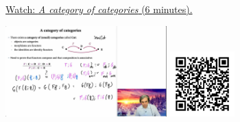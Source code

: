 
\begin{minipage}{10cm}
    \href{https://act4e-spring21.netlify.app/videos/spring2021-functors:semi-and-fun:cat-of-cat.html}{Watch: \emph{A category of categories} (6 minutes).}
        
    \href{https://act4e-spring21.netlify.app/videos/spring2021-functors:semi-and-fun:cat-of-cat.html}{\includegraphics[height=3.5cm]{spring2021-functors:semi-and-fun:cat-of-cat/thumbnails.jpg}}
    \href{https://act4e-spring21.netlify.app/videos/spring2021-functors:semi-and-fun:cat-of-cat.html}{\includegraphics[height=2.5cm]{spring2021-functors:semi-and-fun:cat-of-cat/qrcode.png}}
\end{minipage}
